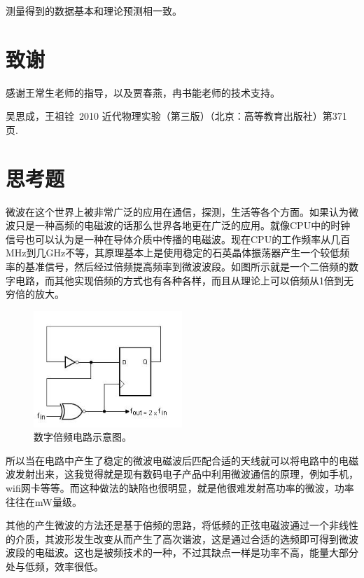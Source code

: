 \documentclass[aps,pre,12pt,preprint,onecolumn,showpacs,showkeys,UTF8]{article}
\begin{document}
测量得到的数据基本和理论预测相一致。

\section{致谢}
感谢王常生老师的指导，以及贾春燕，冉书能老师的技术支持。



\begin{thebibliography}{}
	 吴思成，王祖铨~2010 近代物理实验（第三版）（北京：高等教育出版社）第371页.
%
%
\end{thebibliography}

\clearpage
\appendix
\section{思考题}
微波在这个世界上被非常广泛的应用在通信，探测，生活等各个方面。如果认为微波只是一种高频的电磁波的话那么世界各地更在广泛的应用。就像CPU中的时钟信号也可以认为是一种在导体介质中传播的电磁波。现在CPU的工作频率从几百MHz到几GHz不等，其原理基本上是使用稳定的石英晶体振荡器产生一个较低频率的基准信号，然后经过倍频提高频率到微波波段。如图所示就是一个二倍频的数字电路，而其他实现倍频的方式也有各种各样，而且从理论上可以倍频从1倍到无穷倍的放大。
\begin{figure}[h]
	\begin{center}
			\includegraphics[width=0.5\textwidth]{pic8.png}
		\caption{\label{fig:exp3}数字倍频电路示意图。}
	\end{center}
\end{figure}

所以当在电路中产生了稳定的微波电磁波后匹配合适的天线就可以将电路中的电磁波发射出来，这我觉得就是现有数码电子产品中利用微波通信的原理，例如手机，wifi网卡等等。而这种做法的缺陷也很明显，就是他很难发射高功率的微波，功率往往在mW量级。

其他的产生微波的方法还是基于倍频的思路，将低频的正弦电磁波通过一个非线性的介质，其波形发生改变从而产生了高次谐波，这是通过合适的选频即可得到微波波段的电磁波。这也是被频技术的一种，不过其缺点一样是功率不高，能量大部分处与低频，效率很低。
\end{document}
